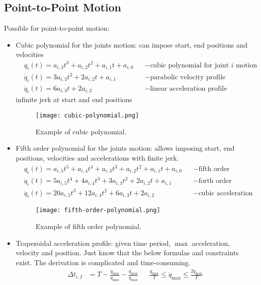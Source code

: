 \subsection{Point-to-Point Motion}
Possible  for point-to-point motion:
\begin{itemize}
	\item Cubic polynomial for the joints motion: can impose start, end positions and velocities
	\begin{align*}
		&q_i(t) = a_{i,3}t^3 + a_{i,2}t^2 + a_{i,1}t + a_{i,0} &&-\text{cubic polynomial for joint $i$ motion}\\
		&\dot{q}_i(t) = 3a_{i,3}t^2 + 2a_{i,2}t + a_{i,1} &&-\text{parabolic velocity profile}\\
		&\ddot{q}_i(t) = 6a_{i,3}t + 2a_{i,2} &&-\text{linear acceleration profile}
	\end{align*}
	 infinite jerk at start and end positions
	\begin{figure}[hbt!]
		\centering
		\texttt{[image: cubic-polynomial.png]}
		\caption{Example of cubic polynomial.}
	\end{figure}
	\item Fifth order polynomial for the joints motion: allows imposing start, end positions, velocities and accelerations with finite jerk.
	\begin{align*}
		&q_i(t) = a_{i,5}t^5 + a_{i,4}t^4 + a_{i,3}t^3 + a_{i,2}t^2 + a_{i,1}t + a_{i,0} &&-\text{fifth order polynomial}\\
		&\dot{q}_i(t) = 5a_{i,5}t^4 + 4a_{i,4}t^3 + 3a_{i,3}t^2 + 2a_{i,2}t + a_{i,1} &&-\text{forth order velocity profile}\\
		&\ddot{q}_i(t) = 20a_{i,5}t^3 + 12a_{i,4}t^2 + 6a_{i,3}t + 2a_{i,2} &&-\text{cubic acceleration profile}
	\end{align*}
	\begin{figure}[hbt!]
		\centering
		\texttt{[image: fifth-order-polynomial.png]}
		\caption{Example of fifth order polynomial.}
	\end{figure}
	\item Trapezoidal acceleration profile: given time period, $\max$ acceleration, velocity and position.
	\note Just know that the below formulas and constraints exist. The derivation is complicated and time-consuming.
	\begin{align*}
		\Delta t_{i,I} &= T - \frac{\dot{q}_{\max}}{\ddot{q}_{\max}} - \frac{q_{\max}}{\dot{q}_{\max}} && \frac{q_{\max}}{T} \leq \dot{q}_{\max} \leq \frac{2q_{\max}}{T}\\

\end{align*}
\end{itemize}
